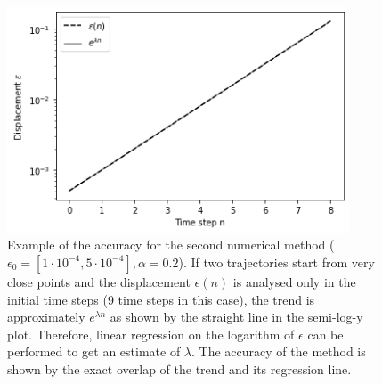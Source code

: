 \documentclass[11pt,titlepage]{article}
\begin{document}
\begin{center}
	\begin{figure} [h]
		\centering
		\includegraphics[width = 4in]{./figures/ex3_3_1.png}
		\caption{Example of the accuracy for the second numerical method ($\epsilon_0 = [1\cdot 10^{-4},5\cdot 10^{-4}], \alpha = 0.2$). If two trajectories start from very close points and the displacement $\epsilon(n)$ is analysed only in the initial time steps (9 time steps in this case), the trend is approximately $e^{\lambda n}$ as shown by the straight line in the semi-log-y plot. Therefore, linear regression on the logarithm of $\epsilon$ can be performed to get an estimate of $\lambda$. The accuracy of the method is shown by the exact overlap of the trend and its regression line.}
		\label{fig_extra_2}
	\end{figure}
\end{center}
\end{document}
